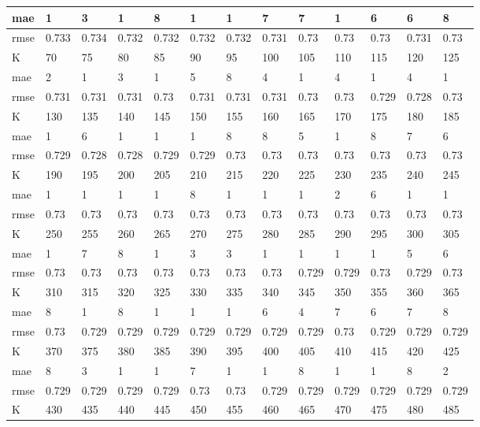 \begin{appendices}
\begin{center}
\begin{tabularx}{\textwidth}{|l|X|X|X|X|X|X|X|X|X|X|X|X|}
		mae & 1 & 3 & 1 & 8 & 1 & 1 & 7 & 7 & 1 & 6 & 6 & 8 \\ \hline 
		rmse & 0.733 & 0.734 & 0.732 & 0.732 & 0.732 & 0.732 & 0.731 & 0.73 & 0.73 & 0.73 & 0.731 & 0.73 \\ \hline 
		\hline 
		K & 70 & 75 & 80 & 85 & 90 & 95 & 100 & 105 & 110 & 115 & 120 & 125 \\ \hline 
		mae & 2 & 1 & 3 & 1 & 5 & 8 & 4 & 1 & 4 & 1 & 4 & 1 \\ \hline 
		rmse & 0.731 & 0.731 & 0.731 & 0.73 & 0.731 & 0.731 & 0.731 & 0.73 & 0.73 & 0.729 & 0.728 & 0.73 \\ \hline 
		\hline 
		K & 130 & 135 & 140 & 145 & 150 & 155 & 160 & 165 & 170 & 175 & 180 & 185 \\ \hline 
		mae & 1 & 6 & 1 & 1 & 1 & 8 & 8 & 5 & 1 & 8 & 7 & 6 \\ \hline 
		rmse & 0.729 & 0.728 & 0.728 & 0.729 & 0.729 & 0.73 & 0.73 & 0.73 & 0.73 & 0.73 & 0.73 & 0.73 \\ \hline 
		\hline 
		K & 190 & 195 & 200 & 205 & 210 & 215 & 220 & 225 & 230 & 235 & 240 & 245 \\ \hline 
		mae & 1 & 1 & 1 & 1 & 8 & 1 & 1 & 1 & 2 & 6 & 1 & 1 \\ \hline 
		rmse & 0.73 & 0.73 & 0.73 & 0.73 & 0.73 & 0.73 & 0.73 & 0.73 & 0.73 & 0.73 & 0.73 & 0.73 \\ \hline 
		\hline 
		K & 250 & 255 & 260 & 265 & 270 & 275 & 280 & 285 & 290 & 295 & 300 & 305 \\ \hline 
		mae & 1 & 7 & 8 & 1 & 3 & 3 & 1 & 1 & 1 & 1 & 5 & 6 \\ \hline 
		rmse & 0.73 & 0.73 & 0.73 & 0.73 & 0.73 & 0.73 & 0.73 & 0.729 & 0.729 & 0.73 & 0.729 & 0.73 \\ \hline 
		\hline 
		K & 310 & 315 & 320 & 325 & 330 & 335 & 340 & 345 & 350 & 355 & 360 & 365 \\ \hline 
		mae & 8 & 1 & 8 & 1 & 1 & 1 & 6 & 4 & 7 & 6 & 7 & 8 \\ \hline 
		rmse & 0.73 & 0.729 & 0.729 & 0.729 & 0.729 & 0.729 & 0.729 & 0.729 & 0.73 & 0.729 & 0.729 & 0.729 \\ \hline 
		\hline 
		K & 370 & 375 & 380 & 385 & 390 & 395 & 400 & 405 & 410 & 415 & 420 & 425 \\ \hline 
		mae & 8 & 3 & 1 & 1 & 7 & 1 & 1 & 8 & 1 & 1 & 8 & 2 \\ \hline 
		rmse & 0.729 & 0.729 & 0.729 & 0.729 & 0.73 & 0.73 & 0.729 & 0.729 & 0.729 & 0.729 & 0.729 & 0.729 \\ \hline 
		\hline 
		K & 430 & 435 & 440 & 445 & 450 & 455 & 460 & 465 & 470 & 475 & 480 & 485 \\ \hline 

\end{tabularx}
\end{center}
\end{appendices}
